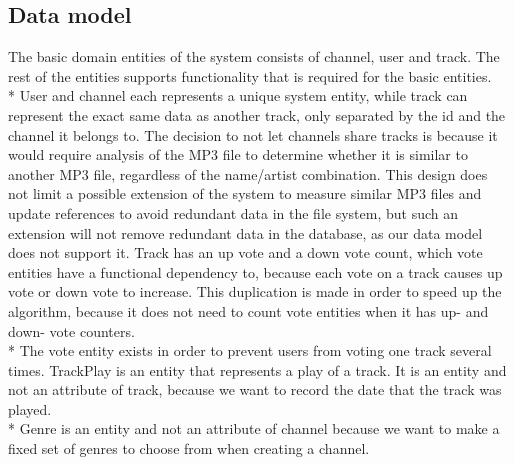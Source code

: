 \documentclass[a4paper,11pt,report]{article}
\begin{document}
{\subsection{Data model}
The basic domain entities of the system consists of channel, user and track. The rest of the entities supports functionality that is required for the basic entities. \\*
User and channel each represents a unique system entity, while track can represent the exact same data as another track, only separated by the id and the channel it belongs to.
The decision to not let channels share tracks is because it would require analysis of the MP3 file to determine whether it is similar to another MP3 file, regardless of the name/artist combination.
This design does not limit a possible extension of the system to measure similar MP3 files and update references to avoid redundant data in the file system, but such an extension will not remove redundant data in the database, as our data model does not support it. 
Track has an up vote and a down vote count, which vote entities have a functional dependency to, because each vote on a track causes up vote or down vote to increase. This duplication is made in order to speed up the algorithm, because it does not need to count vote entities when it has up- and down- vote counters. \\*
The vote entity exists in order to prevent users from voting one track several times.
TrackPlay is an entity that represents a play of a track. It is an entity and not an attribute of track, because we want to record the date that the track was played. \\*
Genre is an entity and not an attribute of channel because we want to make a fixed set of genres to choose from when creating a channel.
\begin{figure}[H]
  \centering

\end{figure}}
\end{document}

